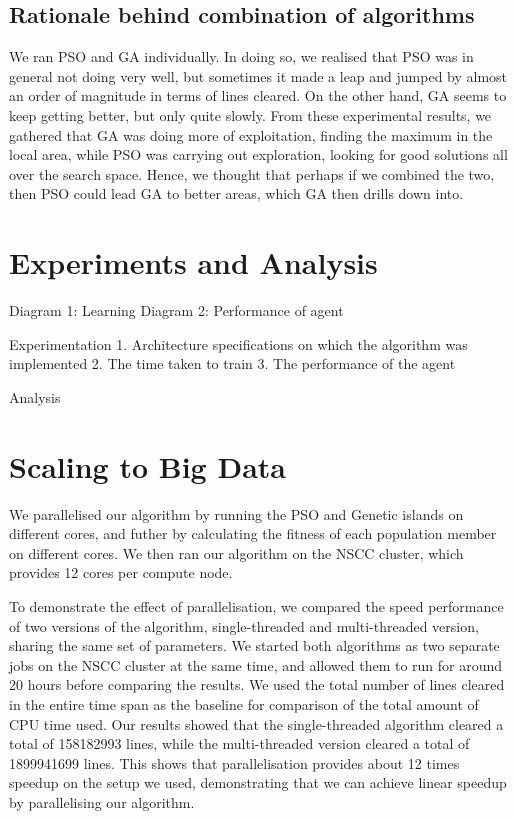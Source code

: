 \documentclass{article}
\begin{document}
\subsection{Rationale behind combination of algorithms}
We ran PSO and GA individually. In doing so, we realised that PSO was in
general not doing very well, but sometimes it made a leap and jumped by almost
an order of magnitude in terms of lines cleared. On the other hand, GA seems to
keep getting better, but only quite slowly. From these experimental results, we
gathered that GA was doing more of exploitation, finding the maximum in the
local area, while PSO was carrying out exploration, looking for good solutions
all over the search space. Hence, we thought that perhaps if we combined the
two, then PSO could lead GA to better areas, which GA then drills down into.

\section{Experiments and Analysis}

Diagram 1: Learning
Diagram 2: Performance of agent

Experimentation
1. Architecture specifications on which the algorithm was implemented
2. The time taken to train
3. The performance of the agent

Analysis

\section{Scaling to Big Data}
We parallelised our algorithm by running the PSO and Genetic islands on
different cores, and futher by calculating the fitness of each population
member on different cores.  We then ran our algorithm on the NSCC cluster,
which provides 12 cores per compute node.

To demonstrate the effect of parallelisation, we compared the speed performance
of two versions of the algorithm, single-threaded and multi-threaded version,
sharing the same set of parameters. We started both algorithms as two separate
jobs on the NSCC cluster at the same time, and allowed them to run for around
20 hours before comparing the results. We used the total number of lines
cleared in the entire time span as the baseline for comparison of the total
amount of CPU time used. Our results showed that the single-threaded algorithm
cleared a total of 158182993 lines, while the multi-threaded version cleared
a total of 1899941699 lines. This shows that parallelisation provides about
12 times speedup on the setup we used, demonstrating that we can achieve
linear speedup by parallelising our algorithm.
\end{document}
